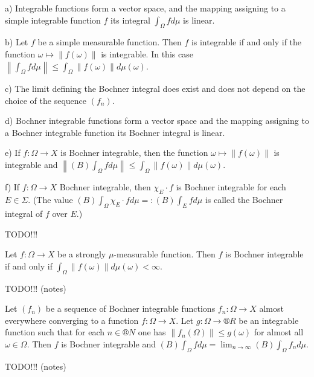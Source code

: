 \documentclass[12pt]{article}					%
\begin{document}
\begin{tvrzeni}
	a) Integrable functions form a vector space, and the mapping assigning to a simple integrable function $f$ its integral $\int_Ω f dμ$ is linear.

	b) Let $f$ be a simple measurable function. Then $f$ is integrable if and only if the function $ω \mapsto \|f(ω)\|$ is integrable. In this case $\left\|\int_Ω f dμ\right\| ≤ \int_Ω \|f(ω)\| d μ(ω)$.

	c) The limit defining the Bochner integral does exist and does not depend on the choice of the sequence $(f_n)$.

	d) Bochner integrable functions form a vector space and the mapping assigning to a Bochner integrable function its Bochner integral is linear.

	e) If $f: Ω \rightarrow X$ is Bochner integrable, then the function $ω \mapsto \|f(ω)\|$ is integrable and $\left\|(B)\int_Ω f dμ\right\| ≤ \int_Ω \|f(ω)\| d μ(ω)$.

	f) If $f: Ω \rightarrow X$ Bochner integrable, then $χ_E·f$ is Bochner integrable for each $E \in Σ$. (The value $(B) \int_Ω χ_E · f dμ =: (B) \int_E f dμ$ is called the Bochner integral of $f$ over $E$.)

	\begin{dukazin}
		TODO!!!
	\end{dukazin}
\end{tvrzeni}

\begin{veta}
	Let $f: Ω \rightarrow X$ be a strongly $μ$-measurable function. Then $f$ is Bochner integrable if and only if $\int_Ω \|f(ω)\| dμ(ω) < ∞$.

	\begin{dukazin}
		TODO!!! (notes)
	\end{dukazin}
\end{veta}

\begin{veta}
	Let $(f_n)$ be a sequence of Bochner integrable functions $f_n: Ω \rightarrow X$ almost everywhere converging to a function $f: Ω \rightarrow X$. Let $g: Ω \rightarrow ®R$ be an integrable function such that for each $n \in ®N$ one has $\|f_n(Ω)\| ≤ g(ω)$ for almost all $ω \in Ω$. Then $f$ is Bochner integrable and $(B) \int_Ω f dμ = \lim_{n \rightarrow ∞} (B) \int_Ω f_n dμ$.

	\begin{dukazin}
		TODO!!! (notes)
	\end{dukazin}
\end{veta}
\end{document}
